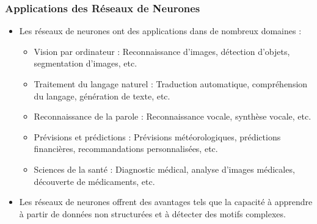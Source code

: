 \documentclass{beamer}
\begin{document}
\begin{frame}
	\frametitle{Applications des Réseaux de Neurones}
	
	\begin{itemize}
		\item Les réseaux de neurones ont des applications dans de nombreux domaines :
		\begin{itemize}
			\item Vision par ordinateur : Reconnaissance d'images, détection d'objets, segmentation d'images, etc.
			\item Traitement du langage naturel : Traduction automatique, compréhension du langage, génération de texte, etc.
			\item Reconnaissance de la parole : Reconnaissance vocale, synthèse vocale, etc.
			\item Prévisions et prédictions : Prévisions météorologiques, prédictions financières, recommandations personnalisées, etc.
			\item Sciences de la santé : Diagnostic médical, analyse d'images médicales, découverte de médicaments, etc.
		\end{itemize}
		\item Les réseaux de neurones offrent des avantages tels que la capacité à apprendre à partir de données non structurées et à détecter des motifs complexes.
	\end{itemize}
	
\end{frame}
\end{document}
